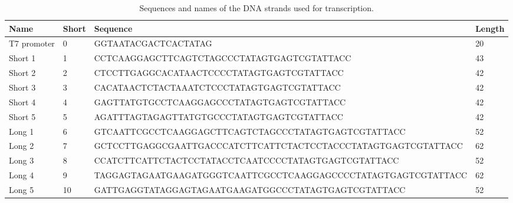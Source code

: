 \begin{table}
\begin{adjustbox}{width=\columnwidth}
\begin{tabular}{llll}
\hline
\textbf{Name}      & \textbf{Short} & \textbf{Sequence}                                           & \textbf{Length} \\
\hline
T7 promoter        & 0          & GGTAATACGACTCACTATAG                                           & 20     \\
Short 1            & 1          & CCTCAAGGAGCTTCAGTCTAGCCCTATAGTGAGTCGTATTACC                    & 43     \\
Short 2            & 2          & CTCCTTGAGGCACATAACTCCCCTATAGTGAGTCGTATTACC                     & 42     \\
Short 3            & 3          & CACATAACTCTACTAAATCTCCCTATAGTGAGTCGTATTACC                     & 42     \\
Short 4            & 4          & GAGTTATGTGCCTCAAGGAGCCCTATAGTGAGTCGTATTACC                    & 42     \\
Short 5            & 5          & AGATTTAGTAGAGTTATGTGCCCTATAGTGAGTCGTATTACC                     & 42     \\
Long 1             & 6          & GTCAATTCGCCTCAAGGAGCTTCAGTCTAGCCCTATAGTGAGTCGTATTACC           & 52     \\
Long 2             & 7          & GCTCCTTGAGGCGAATTGACCCATCTTCATTCTACTCCTACCCTATAGTGAGTCGTATTACC & 62     \\
Long 3             & 8          & CCATCTTCATTCTACTCCTATACCTCAATCCCCTATAGTGAGTCGTATTACC           & 52     \\
Long 4             & 9          & TAGGAGTAGAATGAAGATGGGTCAATTCGCCTCAAGGAGCCCCTATAGTGAGTCGTATTACC & 62     \\
Long 5             & 10         & GATTGAGGTATAGGAGTAGAATGAAGATGGCCCTATAGTGAGTCGTATTACC           & 52     \\
\hline
\end{tabular}
\end{adjustbox}
\caption{Sequences and names of the DNA strands used for transcription.}
\label{dna_strands}
\end{table}

